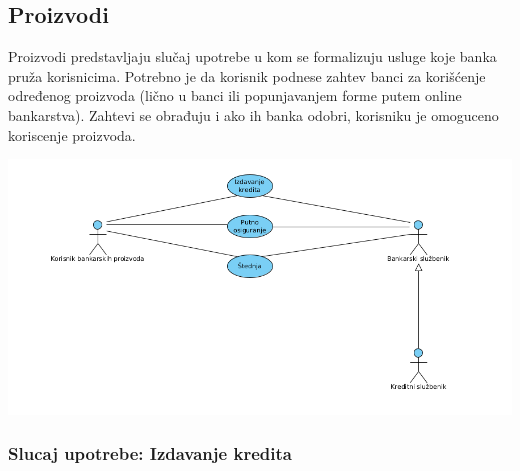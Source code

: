 \documentclass{article}
\begin{document}
\subsection{Proizvodi}

Proizvodi predstavljaju slučaj upotrebe u kom se formalizuju usluge koje banka pruža korisnicima. Potrebno je da korisnik podnese zahtev banci za korišćenje određenog proizvoda (lično u banci ili popunjavanjem forme putem online bankarstva). Zahtevi se obrađuju i ako ih banka odobri, korisniku je omoguceno koriscenje proizvoda.

\includegraphics[scale = 0.4]{./UseCases/Pictures/Bank_products.png}

\subsubsection{Slucaj upotrebe: Izdavanje kredita}
\end{document}
